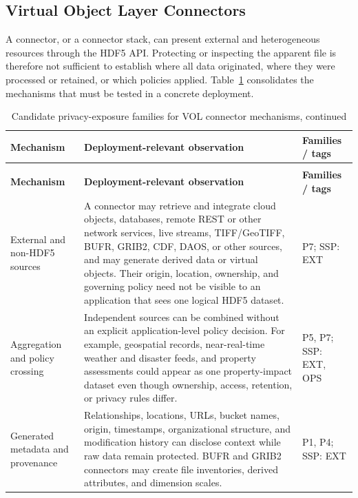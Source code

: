 \documentclass[../main.tex]{subfiles}
\begin{document}
\subsection{Virtual Object Layer Connectors}

A connector, or a connector stack, can present external and heterogeneous
resources through the HDF5 API. Protecting or inspecting the apparent file is
therefore not sufficient to establish where all data originated, where they
were processed or retained, or which policies applied. Table~\ref{tab:vol-privacy-risks}
consolidates the mechanisms that must be tested in a concrete deployment.

\begingroup
\small
\setlength{\tabcolsep}{3pt}
\renewcommand{\arraystretch}{1.14}
\begin{longtable}{@{}p{}p{}p{}@{}}
\caption{Candidate privacy-exposure families for VOL connector mechanisms}
\label{tab:vol-privacy-risks}\\
\hline
\textbf{Mechanism} & \textbf{Deployment-relevant observation} &
\textbf{Families / tags} \\
\hline
\endfirsthead
\caption[]{Candidate privacy-exposure families for VOL connector mechanisms, continued}\\
\hline
\textbf{Mechanism} & \textbf{Deployment-relevant observation} &
\textbf{Families / tags} \\
\hline
\endhead
\hline
\endfoot

External and non-HDF5 sources &
A connector may retrieve and integrate cloud objects, databases, remote REST
or other network services, live streams, TIFF/GeoTIFF, BUFR, GRIB2, CDF,
DAOS, or other sources, and may generate derived data or virtual objects.
Their origin, location, ownership, and governing policy need not be visible to
an application that sees one logical HDF5 dataset. &
P7; SSP: EXT \\
\hline

Aggregation and policy crossing &
Independent sources can be combined without an explicit application-level
policy decision. For example, geospatial records, near-real-time weather and
disaster feeds, and property assessments could appear as one property-impact
dataset even though ownership, access, retention, or privacy rules differ. &
P5, P7; SSP: EXT, OPS \\
\hline

Generated metadata and provenance &
Relationships, locations, URLs, bucket names, origin, timestamps,
organizational structure, and modification history can disclose context while
raw data remain protected. BUFR and GRIB2 connectors may create file
inventories, derived attributes, and dimension scales. &
P1, P4; SSP: EXT \\
\hline


\end{longtable}
\end{document}
